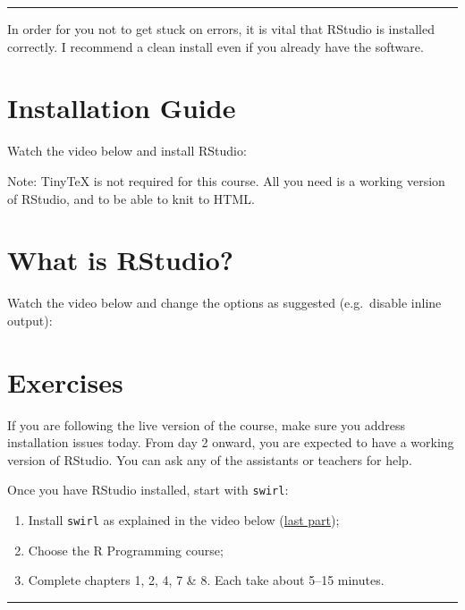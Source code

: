\documentclass[
]{book}
\providecommand{\tightlist}{%
  \setlength{\itemsep}{0pt}\setlength{\parskip}{0pt}}
\begin{document}
\begin{center}\rule{0.5\linewidth}{0.5pt}\end{center}

In order for you not to get stuck on errors, it is vital that RStudio is installed correctly. I recommend a clean install even if you already have the software.

\hypertarget{installation-guide}{%
\section{Installation Guide}\label{installation-guide}}

Watch the video below and install RStudio:

Note: TinyTeX is not required for this course. All you need is a working version of RStudio, and to be able to knit to HTML.

\hypertarget{what-is-rstudio}{%
\section{What is RStudio?}\label{what-is-rstudio}}

Watch the video below and change the options as suggested (e.g.~disable inline output):

\hypertarget{exercises}{%
\section{Exercises}\label{exercises}}

If you are following the live version of the course, make sure you address installation issues today. From day 2 onward, you are expected to have a working version of RStudio. You can ask any of the assistants or teachers for help.

Once you have RStudio installed, start with \texttt{swirl}:

\begin{enumerate}
\def\labelenumi{\arabic{enumi}.}
\tightlist
\item
  Install \texttt{swirl} as explained in the video below (\href{https://youtu.be/eKKil5iyxLM?t=148}{last part});
\item
  Choose the R Programming course;
\item
  Complete chapters 1, 2, 4, 7 \& 8. Each take about 5--15 minutes.
\end{enumerate}

\begin{center}\rule{0.5\linewidth}{0.5pt}\end{center}
\end{document}

